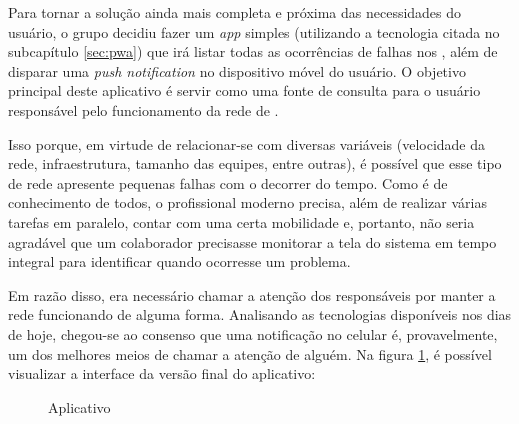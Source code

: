Para tornar a solução ainda mais completa e próxima das necessidades do usuário, o grupo decidiu fazer um \textit{app} simples (utilizando a tecnologia citada no subcapítulo \ref{sec:pwa}) que irá listar todas as ocorrências de falhas nos \containers{}, além de disparar uma \textit{push notification} no dispositivo móvel do usuário. O objetivo principal deste aplicativo é servir como uma fonte de consulta para o usuário responsável pelo funcionamento da rede de \containers{}.

Isso porque, em virtude de relacionar-se com diversas variáveis (velocidade da rede, infraestrutura, tamanho das equipes, entre outras), é possível que esse tipo de rede apresente pequenas falhas com o decorrer do tempo. Como é de conhecimento de todos, o profissional moderno precisa, além de realizar várias tarefas em paralelo, contar com uma certa mobilidade e, portanto, não seria agradável que um colaborador precisasse monitorar a tela do sistema em tempo integral para identificar quando ocorresse um problema.

Em razão disso, era necessário chamar a atenção dos responsáveis por manter a rede funcionando de alguma forma. Analisando as tecnologias disponíveis nos dias de hoje, chegou-se ao consenso que uma notificação no celular é, provavelmente, um dos melhores meios de chamar a atenção de alguém. Na figura \ref{fig:aplicativo}, é possível visualizar a interface da versão final do aplicativo:

\begin{figure}[!htb]
    \centering
    \caption{Aplicativo}
    \label{fig:aplicativo}
\end{figure}